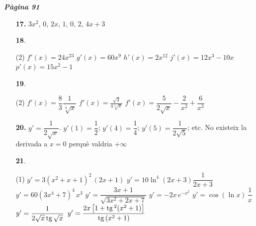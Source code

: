 \documentclass[a4paper, pdf, twoside]{book}
\begin{document}
{\textbf{\em Pàgina 91}} \hrulefill
\begin{enumerate}
\vspace{0.25cm}
\item[\fontfamily{phv}\selectfont\color{blue}\textbf{17. }] 
$3x^2$, $0$, $2x$, $1$, $0$, $2$, $4x+3$
 \end{enumerate}
\begin{enumerate}
\vspace{0.25cm}



 \item[\fontfamily{phv}\selectfont\color{blue}\textbf{18}. ] 
 \begin{tasks}[column-sep=1em, item-indent=1.3333em](2)
	 \task $f'(x)=24 x^{23}$
	 \task $g'(x)=60 x^9$
	 \task $h'(x)=2 x^{12}$
	 \task $j'(x)=12 x^3 -10x$
	 \task $p'(x)=15x^2-1$
\end{tasks}
\vspace{0.25cm}



 \item[\fontfamily{phv}\selectfont\color{blue}\textbf{19}. ] 
 \begin{tasks}[column-sep=1em, item-indent=1.3333em](2)
	 \task $f'(x)=\dfrac {8}{3}\dfrac {1}{\sqrt [3]{x}}$
	 \task $f'(x)=\frac {\sqrt {3}}{4\sqrt [4]{x}}$
	 \task $f'(x)=\dfrac {5}{2\sqrt {x}}-\dfrac {2}{x^2}+\dfrac {6}{x^3}$
\end{tasks}
\vspace{0.25cm}
\item[\fontfamily{phv}\selectfont\color{blue}\textbf{20. }] 
$y'=\dfrac {1}{2\sqrt {x}}$. $y'(1)=\dfrac {1}{2}$; $y'(4)=\dfrac {1}{4}$; $y'(5)=\dfrac {1}{2\sqrt {5}}$; etc. No existeix la derivada a $x=0$ perquè valdria $+\infty $
\vspace{0.25cm}



 \item[\fontfamily{phv}\selectfont\color{blue}\textbf{21}. ]  \scalebox{0.6}{\simbolclau } 
 \begin{tasks}[column-sep=1em, item-indent=1.3333em](1)
	 \task $y'=3(x^2+x+1)^2\,(2x+1)$
	 \task* $y'=10\ln ^4 (2x+3) \dfrac {1}{2x+3}$
	 \task $y'=60(3x^4+7)^4 \,x^3$
	 \task* $y'=\dfrac {3x+1}{\sqrt {3x^2+2x+7}}$
	 \task $y'=-2x \,e^{-x^2}$
	 \task* $y'=\cos (\ln x)\,\dfrac {1}{x}$
	 \task* $y'=\dfrac {1}{2\sqrt {x}\,\mathrm{tg}\, \sqrt {x}}$
	 \task* $y'=\dfrac {2x \left [1+\mathrm{tg}\, ^2(x^2+1)\right ]}{\mathrm{tg}\, (x^2+1)}$
\end{tasks}
\vspace{0.25cm}



\end{enumerate}
\end{document}

